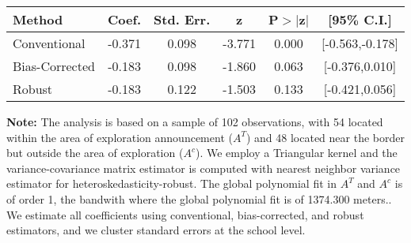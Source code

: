 \begin{table}[htbp]\centering
 \footnotesize 
\begin{tabular}{lccccc}
\hline\hline
Method & Coef. & Std. Err. & z & P$>|$z$|$ & [95\% C.I.] \\ 
\hline \hline  
Conventional & -0.371 & 0.098 & -3.771 & 0.000 & [-0.563,-0.178] \\ 
 Bias-Corrected & -0.183 & 0.098 & -1.860 & 0.063 & [-0.376,0.010] \\ 
Robust & -0.183 & 0.122 & -1.503 & 0.133 & [-0.421,0.056] \\ 
  \hline\hline
\end{tabular}
\label{table:rd}
\begin{tablenotes} 
  \justifying \tiny \textbf{Note: }    
   The analysis is based on a sample of 102 observations, with 54 located within the area of exploration announcement ($A^{T}$) and 48 located near the border but outside the area of exploration  ($A^{c}$). 
           We employ a Triangular kernel and the variance-covariance matrix estimator is computed with nearest neighbor variance estimator for heteroskedasticity-robust. The global polynomial fit in  $A^{T}$ and $A^{c}$ is of order 1, the bandwith where the global polynomial fit is of 1374.300 meters.. We estimate all coefficients using conventional, bias-corrected, and robust estimators, and we cluster standard errors at the school level. \end{tablenotes} 
 \end{table} 
